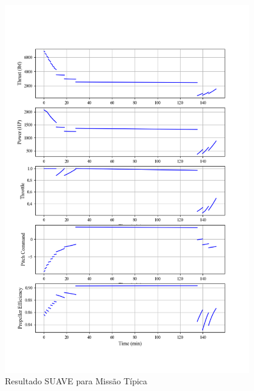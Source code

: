 \begin{figure}[H]
\centering
\includegraphics[width=0.95\textwidth]{images/parte4/engine0.png}
\caption{Resultado SUAVE para Missão Típica}
\label{fig:engine_mission}
\end{figure}

